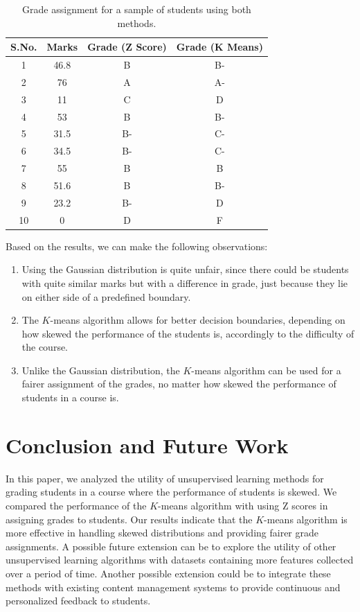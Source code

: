 \documentclass[conference]{IEEEtran}
\begin{document}
\begin{table}[!h]
    \centering
    \begin{tabular}{|c|c|c|c|}
        \hline
        \textbf{S.No.} & \textbf{Marks} & \textbf{Grade (Z Score)} & \textbf{Grade (K Means)} \\
        \hline
        1 & 46.8 & B & B- \\
        \hline
        2 & 76 & A & A- \\
        \hline
        3 & 11 & C & D \\
        \hline
        4 & 53 & B & B- \\
        \hline
        5 & 31.5 & B- & C- \\
        \hline
        6 & 34.5 & B- & C- \\
        \hline
        7 & 55 & B & B \\
        \hline
        8 & 51.6 & B & B- \\
        \hline
        9 & 23.2 & B- & D \\
        \hline
        10 & 0 & D & F \\
        \hline
    \end{tabular}
    \caption{Grade assignment for a sample of students using both methods.}
    \label{tab:grade-assignment}
\end{table}

Based on the results, we can make the following observations:
\begin{enumerate}
    \item Using the Gaussian distribution is quite unfair, since there could be
    students with quite similar marks but with a difference in grade, just
    because they lie on either side of a predefined boundary.
    \item The $K$-means algorithm allows for better decision boundaries,
    depending on how skewed the performance of the students is, accordingly to
    the difficulty of the course.
    \item Unlike the Gaussian distribution, the $K$-means algorithm can be used
    for a fairer assignment of the grades, no matter how skewed the performance
    of students in a course is.
\end{enumerate}

\section{Conclusion and Future Work}
\label{sec:conclusion}

In this paper, we analyzed the utility of unsupervised learning methods for
grading students in a course where the performance of students is skewed. We
compared the performance of the $K$-means algorithm with using Z scores in
assigning grades to students. Our results indicate that the $K$-means algorithm
is more effective in handling skewed distributions and providing fairer grade
assignments. A possible future extension can be to explore the utility of other
unsupervised learning algorithms with datasets containing more features
collected over a period of time. Another possible extension could be to
integrate these methods with existing content management systems to provide
continuous and personalized feedback to students.



\end{document}
